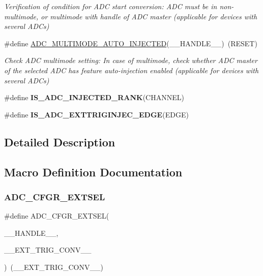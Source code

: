 \begin{DoxyCompactItemize}
\begin{DoxyCompactList}\small\item\em Verification of condition for A\+DC start conversion\+: A\+DC must be in non-\/multimode, or multimode with handle of A\+DC master (applicable for devices with several A\+D\+Cs) \end{DoxyCompactList}\item 
\#define \hyperlink{group___a_d_c_ex___private___macro_gaa359107fadfc631d25f798aad7c857fd}{A\+D\+C\+\_\+\+M\+U\+L\+T\+I\+M\+O\+D\+E\+\_\+\+A\+U\+T\+O\+\_\+\+I\+N\+J\+E\+C\+T\+ED}(\+\_\+\+\_\+\+H\+A\+N\+D\+L\+E\+\_\+\+\_\+)~(R\+E\+S\+ET)
\begin{DoxyCompactList}\small\item\em Check A\+DC multimode setting\+: In case of multimode, check whether A\+DC master of the selected A\+DC has feature auto-\/injection enabled (applicable for devices with several A\+D\+Cs) \end{DoxyCompactList}\item 
\#define {\bfseries I\+S\+\_\+\+A\+D\+C\+\_\+\+I\+N\+J\+E\+C\+T\+E\+D\+\_\+\+R\+A\+NK}(C\+H\+A\+N\+N\+EL)
\item 
\#define {\bfseries I\+S\+\_\+\+A\+D\+C\+\_\+\+E\+X\+T\+T\+R\+I\+G\+I\+N\+J\+E\+C\+\_\+\+E\+D\+GE}(E\+D\+GE)
\end{DoxyCompactItemize}


\subsection{Detailed Description}


\subsection{Macro Definition Documentation}
\mbox{\label{group___a_d_c_ex___private___macro_ga08652deb6ad9a73620490807ac8c6053}} 
\subsubsection{\texorpdfstring{A\+D\+C\+\_\+\+C\+F\+G\+R\+\_\+\+E\+X\+T\+S\+EL}{ADC\_CFGR\_EXTSEL}}
{\footnotesize\ttfamily \#define A\+D\+C\+\_\+\+C\+F\+G\+R\+\_\+\+E\+X\+T\+S\+EL(\begin{DoxyParamCaption}\item[{}]{\+\_\+\+\_\+\+H\+A\+N\+D\+L\+E\+\_\+\+\_\+,  }\item[{}]{\+\_\+\+\_\+\+E\+X\+T\+\_\+\+T\+R\+I\+G\+\_\+\+C\+O\+N\+V\+\_\+\+\_\+ }\end{DoxyParamCaption})~(\+\_\+\+\_\+\+E\+X\+T\+\_\+\+T\+R\+I\+G\+\_\+\+C\+O\+N\+V\+\_\+\+\_\+)}



